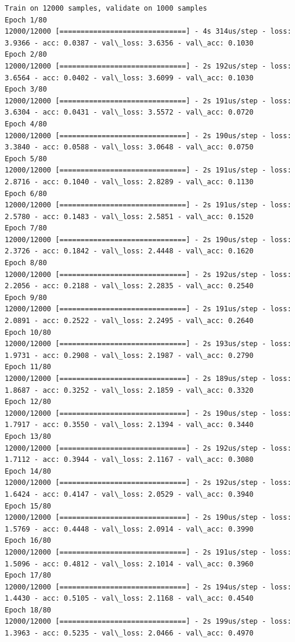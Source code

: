 \documentclass[11pt]{article}
\begin{document}
    \begin{Verbatim}[commandchars=\\\{\}]
Train on 12000 samples, validate on 1000 samples
Epoch 1/80
12000/12000 [==============================] - 4s 314us/step - loss: 3.9366 - acc: 0.0387 - val\_loss: 3.6356 - val\_acc: 0.1030
Epoch 2/80
12000/12000 [==============================] - 2s 192us/step - loss: 3.6564 - acc: 0.0402 - val\_loss: 3.6099 - val\_acc: 0.1030
Epoch 3/80
12000/12000 [==============================] - 2s 191us/step - loss: 3.6304 - acc: 0.0431 - val\_loss: 3.5572 - val\_acc: 0.0720
Epoch 4/80
12000/12000 [==============================] - 2s 190us/step - loss: 3.3840 - acc: 0.0588 - val\_loss: 3.0648 - val\_acc: 0.0750
Epoch 5/80
12000/12000 [==============================] - 2s 191us/step - loss: 2.8716 - acc: 0.1040 - val\_loss: 2.8289 - val\_acc: 0.1130
Epoch 6/80
12000/12000 [==============================] - 2s 191us/step - loss: 2.5780 - acc: 0.1483 - val\_loss: 2.5851 - val\_acc: 0.1520
Epoch 7/80
12000/12000 [==============================] - 2s 190us/step - loss: 2.3726 - acc: 0.1842 - val\_loss: 2.4448 - val\_acc: 0.1620
Epoch 8/80
12000/12000 [==============================] - 2s 192us/step - loss: 2.2056 - acc: 0.2188 - val\_loss: 2.2835 - val\_acc: 0.2540
Epoch 9/80
12000/12000 [==============================] - 2s 191us/step - loss: 2.0891 - acc: 0.2522 - val\_loss: 2.2495 - val\_acc: 0.2640
Epoch 10/80
12000/12000 [==============================] - 2s 193us/step - loss: 1.9731 - acc: 0.2908 - val\_loss: 2.1987 - val\_acc: 0.2790
Epoch 11/80
12000/12000 [==============================] - 2s 189us/step - loss: 1.8687 - acc: 0.3252 - val\_loss: 2.1859 - val\_acc: 0.3320
Epoch 12/80
12000/12000 [==============================] - 2s 190us/step - loss: 1.7917 - acc: 0.3550 - val\_loss: 2.1394 - val\_acc: 0.3440
Epoch 13/80
12000/12000 [==============================] - 2s 192us/step - loss: 1.7112 - acc: 0.3944 - val\_loss: 2.1167 - val\_acc: 0.3080
Epoch 14/80
12000/12000 [==============================] - 2s 192us/step - loss: 1.6424 - acc: 0.4147 - val\_loss: 2.0529 - val\_acc: 0.3940
Epoch 15/80
12000/12000 [==============================] - 2s 190us/step - loss: 1.5769 - acc: 0.4448 - val\_loss: 2.0914 - val\_acc: 0.3990
Epoch 16/80
12000/12000 [==============================] - 2s 191us/step - loss: 1.5096 - acc: 0.4812 - val\_loss: 2.1014 - val\_acc: 0.3960
Epoch 17/80
12000/12000 [==============================] - 2s 194us/step - loss: 1.4430 - acc: 0.5105 - val\_loss: 2.1168 - val\_acc: 0.4540
Epoch 18/80
12000/12000 [==============================] - 2s 199us/step - loss: 1.3963 - acc: 0.5235 - val\_loss: 2.0466 - val\_acc: 0.4970

\end{Verbatim}
\end{document}
